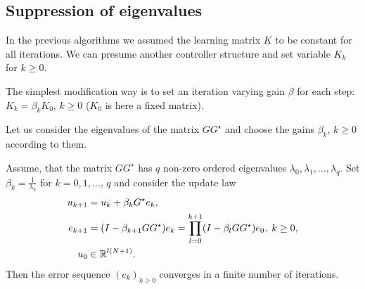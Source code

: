 \subsection{Suppression of eigenvalues} 

In the previous algorithms we assumed the learning matrix $K$ to be constant for all iterations.
We can presume another controller structure and set variable $K_k$ for $k\geq 0$. 

The simplest modification way is to set an iteration varying gain $\beta$ for each step: $K_k = \beta_k K_0$, $k\geq 0$ ($K_0$ is here a fixed matrix).

Let us consider the eigenvalues of the matrix $GG^\star$ and choose the gains $\beta_k$, $k \geq 0$ according to them. 

\begin{theo}
	Assume, that the matrix $GG^\star$ has $q$ non-zero ordered eigenvalues $\lambda_0, \lambda_1, \dots ,  \lambda_q$. Set $\beta_k = \frac{1}{\lambda_k}$ for $k = 0, 1, \dots, \, q$ and consider the update law
	\begin{align}
	\label{eq:cl_var0}
	\begin{split}
	u_{k+1} &= u_k + \beta_k G^\star e_k, \\
	e _{k+1} &= (I - \beta_{k+1}  GG^\star) e_{k}  = \prod_{l = 0}^{k+1} (I - \beta_{l}  GG^\star) e_0, \; k\geq 0,\\
	u_0 &\in {\mathbb{R}}^{l (N+1)}.
	\end{split}
	\end{align}
	Then the error sequence $(e_k)_{k\geq 0}$ converges in a finite number of iterations.     
\end{theo}
